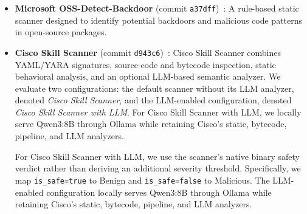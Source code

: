\begin{itemize}
    \item \textbf{Microsoft OSS-Detect-Backdoor} (commit \texttt{a37dff})~\cite{microsoft_ossgadget}: A rule-based static scanner designed to identify potential backdoors and malicious code patterns in open-source packages.

    \item \textbf{Cisco Skill Scanner} (commit \texttt{d943c6})~\cite{cisco_skill_scanner}:
Cisco Skill Scanner combines YAML/YARA signatures, source-code and
bytecode inspection, static behavioral analysis, and an optional
LLM-based semantic analyzer. 
We evaluate two configurations: the default scanner without its LLM
analyzer, denoted \emph{Cisco Skill Scanner}, and the LLM-enabled
configuration, denoted \emph{Cisco Skill Scanner with LLM}. For
Cisco Skill Scanner with LLM, we locally serve Qwen3:8B through
Ollama while retaining Cisco's static, bytecode, pipeline, and LLM
analyzers.

For Cisco Skill Scanner with LLM, we use the scanner's
native binary safety verdict rather than deriving an additional
severity threshold. Specifically, we map
\texttt{is\_safe=true} to Benign and
\texttt{is\_safe=false} to Malicious. The LLM-enabled
configuration locally serves Qwen3:8B through Ollama while
retaining Cisco's static, bytecode, pipeline, and LLM analyzers.




\end{itemize}
